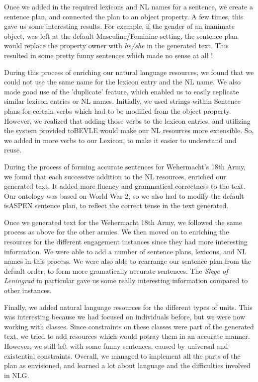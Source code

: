 \documentclass[12pt, letterpaper]{article}
\begin{document}
    \noindent
    Once we added in the required lexicons and NL names for a sentence, we create a sentence plan, and connected the plan
    to an object property. A few times, this gave us some interesting results. 
    For example, if the gender of an inanimate object, was left at the default Masculine/Feminine setting,
    the sentence plan would replace the property owner with \textit{he/she} in the generated text. 
    This resulted in some pretty funny sentences which made no sense at all !

    \vspace{4mm}

    \noindent
    During this process of enriching our natural language resources, we found that we could not use the same name for
    the lexicon entry and the NL name. 
    We also made good use of the 'duplicate' feature, which enabled us to easily replicate similar lexicon entries or
    NL names.
    Initially, we used strings within Sentence plans for certain verbs which had to be modified from the object property.
    However, we realized that adding those verbs to the lexicon entries, and utilizing the system provided toBEVLE
    would make our NL resources more extensible.
    So, we added in more verbs to our Lexicon, to make it easier to understand and reuse.

    \vspace{4mm}

    \noindent
    During the process of forming accurate sentences for Wehermacht's 18th Army, we found that each successive addition
    to the NL resources, enriched our generated text.
    It added more fluency and grammatical correctness to the text.
    Our ontology was based on World War 2, so we also had to modify the default isASPEN sentence plan, to reflect the
    correct tense in the text generated.

    \vspace{4mm}

    \noindent
    Once we generated text for the Wehermacht 18th Army, we followed the same process as above for the other armies.
    We then moved on to enriching the resources for the different engagement instances since they had more interesting
    information.
    We were able to add a number of sentence plans, lexicons, and NL names in this process.
    We were also able to rearrange our sentence plan from the defualt order, to form more gramatically accurate sentences.
    The \textit{Siege of Leningrad} in particular gave us some really interesting information compared to other instances.

    \vspace{4mm}

    \noindent
    Finally, we added natural language resources for the different types of units.
    This was interesting because we had focused on individuals before, but we were now working with classes.
    Since constraints on these classes were part of the generated text, we tried to add resources which
    would potray them in an accurate manner.
    However, we still left with some funny sentences, caused by universal and existential constraints.
    Overall, we managed to implement all the parts of the plan as envisioned, and
    learned a lot about language and the difficulties involved in NLG.
\end{document}
